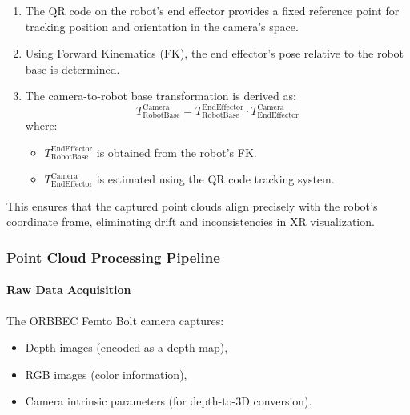 \begin{enumerate}
    \item The QR code on the robot’s end effector provides a fixed reference point for tracking position and orientation in the camera's space.
    \item Using Forward Kinematics (FK), the end effector’s pose relative to the robot base is determined.
    \item The camera-to-robot base transformation is derived as:
    \begin{equation}
        T_{\mathrm{Robot Base}}^{\mathrm{Camera}} = T_{\mathrm{Robot Base}}^{\mathrm{End Effector}} \cdot T_{\mathrm{End Effector}}^{\mathrm{Camera}}
    \end{equation}
    where:
    \begin{itemize}
        \item $T_{\mathrm{Robot Base}}^{\mathrm{End Effector}}$ is obtained from the robot’s FK.
        \item $T_{\mathrm{End Effector}}^{\mathrm{Camera}}$ is estimated using the QR code tracking system.
    \end{itemize}
\end{enumerate}

This ensures that the captured point clouds align precisely with the robot’s coordinate frame, eliminating drift and inconsistencies in XR visualization.

\subsubsection{Point Cloud Processing Pipeline}
\label{appendix:Point Cloud Processing Pipeline}
\paragraph{Raw Data Acquisition}
The ORBBEC Femto Bolt camera captures:
\begin{itemize}
    \item Depth images (encoded as a depth map),
    \item RGB images (color information),
    \item Camera intrinsic parameters (for depth-to-3D conversion).
\end{itemize}

